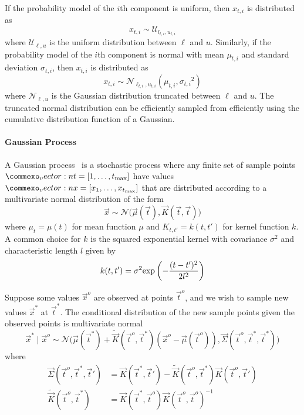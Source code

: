 If the probability model of the $i$th component is uniform, then $x_{t,i}$ is distributed as
\begin{equation}
    x_{t,i} \sim \mathcal{U}_{l_{t, i},u_{t,i}}
\end{equation}
where $\mathcal{U}_{\ell, u}$ is the uniform distribution between $\ell$ and $u$. Similarly, if the probability model of the $i$th component is normal with mean $\mu_{t,i}$ and standard deviation $\sigma_{t,i}$, then $x_{t,i}$ is distributed as
\begin{equation}
    x_{t,i} \sim \mathcal{N}_{\ell_{t,i},u_{t,i}}(\mu_{t,i}, {\sigma_{t,i}}^2)
\end{equation}
where $\mathcal{N}_{\ell,u}$ is the Gaussian distribution truncated between $\ell$ and $u$. The truncated normal distribution can be efficiently sampled from efficiently using the cumulative distribution function of a Gaussian. 



\paragraph{Gaussian Process}
A Gaussian process~\cite{williams2006gaussian} is a stochastic process where any finite set of sample points $\vec{t} = \left[ 1, \ldots, t_{\rm max} \right]$ have values $\vec{x} = \left[ x_1, \ldots, x_{t_{\rm max}} \right]$ that are distributed according to a multivariate normal distribution of the form
\begin{equation}
    \vec{x} \sim \mathcal{N}\big( \vec{\mu}(\vec{t}), \vec{K}(\vec{t}, \vec{t}) \big)
\end{equation}
where $\mu_t = \mu(t)$ for mean function $\mu$ and $K_{t, t'} = k(t, t')$ for kernel function $k$. A common choice for $k$ is the squared exponential kernel with covariance $\sigma^2$ and characteristic length $l$ given by
\begin{equation}
    k(t, t') = \sigma^2 {\rm exp}\left( - \frac{(t - t')^2}{2 l^2}\right)
\end{equation}


Suppose some values $\vec{x}^o$ are observed at points $\vec{t}^o$, and we wish to sample new values $\vec{x}^*$ at $\vec{t}^*$. The conditional distribution of the new sample points given the observed points is multivariate normal
\begin{equation}
    \vec{x}^* \mid \vec{x}^o \sim \mathcal{N} \big (\vec{\mu}(\vec{t}^*) + \tilde{\vec{K}}(\vec{t}^o, \vec{t}^*)(\vec{x}^o - \vec{\mu}(\vec{t}^o)), \vec{\Sigma}(\vec{t}^o, \vec{t}^*,\vec{t}^*) \big)
\end{equation}
where 
\begin{align}
     \vec{\Sigma}(\vec{t}^o, \vec{t}^*,\vec{t}') &= \vec{K}(\vec{t}^*, \vec{t}') -  \tilde{\vec{K}}(\vec{t}^o, \vec{t}^*)\vec{K}(\vec{t}^o, \vec{t}') \\
    \tilde{\vec{K}}(\vec{t}^o, \vec{t}^*) &= \vec{K}(\vec{t}^*, \vec{t}^o) \vec{K}(\vec{t}^o, \vec{t}^o)^{-1}
\end{align}

